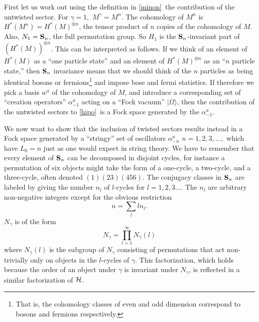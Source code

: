 \documentclass[12pt]{article}
\numberwithin{equation}{section}
\begin{document}
First let us work out using the definition in \eqref{minon}\ the contribution
of the untwisted  sector.  For $\gamma=1,$ $M^\gamma=M^n$.  The
cohomology of $M^n$ is $H^*(M^n)=H^*(M)^{\otimes n}$,
the tensor product
of $n$ copies of the cohomology of $M$.  Also, $N_1={\bf S}_n$, the
full permutation group.  So  $H_1$ is the ${\bf S}_n$-invariant
part of $\left(H^*(M)\right)^{\otimes n}$.  This can be interpreted
as follows.  If we think of an element of $H^*(M)$ as a
``one particle state'' and an element of $H^*(M)^{\otimes n}$
as an ``$n$ particle state,'' then ${\bf S}_n$ invariance means
that we should think of the $n$ particles as
being identical bosons or fermions\footnote{That is, the cohomology
  classes of even and odd dimension correspond to bosons and fermions
respectively.}
and impose bose and fermi statistics.  If therefore we pick
a basis $w^a$ of the cohomology of $M$, and introduce a corresponding
set of ``creation operators'' $\alpha^a_{-1}$ acting on a ``Fock vacuum''
$|\Omega\rangle$, then the contribution of the untwisted sectors
to \eqref{hipo}\ is a Fock space generated by the $\alpha^a_{-1}$.

We now want to show that the inclusion of twisted sectors results
instead in a
Fock space generated by a ``stringy'' set of
oscillators $\alpha^a_{-n}$ $n=1,2,3,\dots,$
which have $L_0=n$ just as one would expect in string theory.
We have to remember that every element of ${\bf S}_n$ can be decomposed
in disjoint cycles, for instance a permutation of six objects
might take the form of a one-cycle, a two-cycle, and a three-cycle,
often denoted $(1)(23)(456)$. The conjugacy classes in ${\bf S}_n$
are labeled by giving the number $n_l$ of $l$-cycles for $l=1,2,3\dots$.
The $n_l$ are arbitrary non-negative integers
except for the obvious restriction
\begin{equation}
  \label{ponms}
  n=\sum_lln_l.
\end{equation}
$N_\gamma$ is of the form
\begin{equation}
  \label{pms}
  N_\gamma=\prod_{l=1}^\infty N_\gamma(l)
\end{equation}
where $N_\gamma(l)$ is the subgroup of $N_\gamma$ consisting of permutations
that act non-trivially only on objects in the $l$-cycles of $\gamma$.
This factorization, which holds because the order of an object
under $\gamma$ is invariant under $N_\gamma$, is reflected in a similar
factorization of ${\cal H}$.
\end{document}
